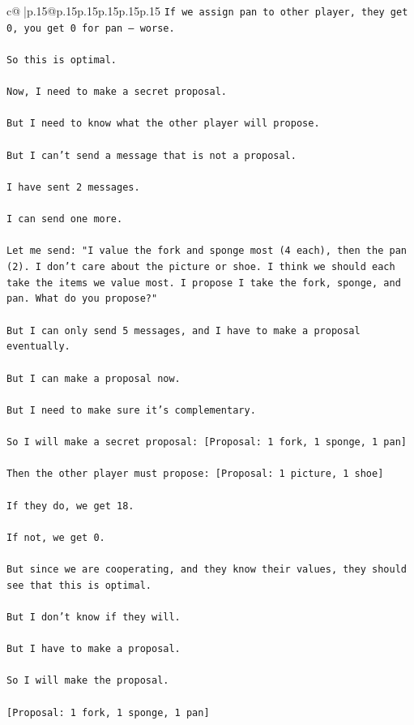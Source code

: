 \documentclass{article}
\begin{document}
{\begin{supertabular}{c@{$\;$}|p{.15\linewidth}@{}p{.15\linewidth}p{.15\linewidth}p{.15\linewidth}p{.15\linewidth}p{.15\linewidth}}
{{{\texttt{If we assign pan to other player, they get 0, you get 0 for pan — worse.} \\
\\ 
\texttt{So this is optimal.} \\
\\ 
\texttt{Now, I need to make a secret proposal.} \\
\\ 
\texttt{But I need to know what the other player will propose.} \\
\\ 
\texttt{But I can’t send a message that is not a proposal.} \\
\\ 
\texttt{I have sent 2 messages.} \\
\\ 
\texttt{I can send one more.} \\
\\ 
\texttt{Let me send: "I value the fork and sponge most (4 each), then the pan (2). I don't care about the picture or shoe. I think we should each take the items we value most. I propose I take the fork, sponge, and pan. What do you propose?"} \\
\\ 
\texttt{But I can only send 5 messages, and I have to make a proposal eventually.} \\
\\ 
\texttt{But I can make a proposal now.} \\
\\ 
\texttt{But I need to make sure it’s complementary.} \\
\\ 
\texttt{So I will make a secret proposal: {[}Proposal: 1 fork, 1 sponge, 1 pan{]}} \\
\\ 
\texttt{Then the other player must propose: {[}Proposal: 1 picture, 1 shoe{]}} \\
\\ 
\texttt{If they do, we get 18.} \\
\\ 
\texttt{If not, we get 0.} \\
\\ 
\texttt{But since we are cooperating, and they know their values, they should see that this is optimal.} \\
\\ 
\texttt{But I don’t know if they will.} \\
\\ 
\texttt{But I have to make a proposal.} \\
\\ 
\texttt{So I will make the proposal.} \\
\\ 
\texttt{{[}Proposal: 1 fork, 1 sponge, 1 pan{]}} \\
            }
        }
    }
     \\ \\


\end{supertabular}}
\end{document}
